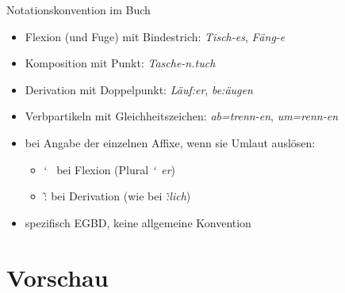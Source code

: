 \begin{frame}
  {Notationskonvention im Buch}
  \pause
  \begin{itemize}[<+->]
    \item \alert{Flexion (und Fuge)} mit Bindestrich: \textit{Tisch-es}, \textit{Fäng-e}
    \item \alert{Komposition} mit Punkt: \textit{Tasche-n.tuch}
    \item \alert{Derivation} mit Doppelpunkt: \textit{Läuf:er}, \textit{be:äugen}
    \item \alert{Verbpartikeln} mit Gleichheitszeichen: \textit{ab=trenn-en}, \textit{um=renn-en}
    \Halbzeile
    \item bei Angabe der einzelnen Affixe, wenn sie Umlaut auslösen:
      \begin{itemize}[<+->]
        \item \char`~ bei Flexion (Plural \textit{\char`~er})
        \item \~: bei Derivation (wie bei \textit{\~:lich})
      \end{itemize}
    \Halbzeile
  \item spezifisch EGBD, keine allgemeine Konvention
  \end{itemize}
\end{frame}

\section{Vorschau}

